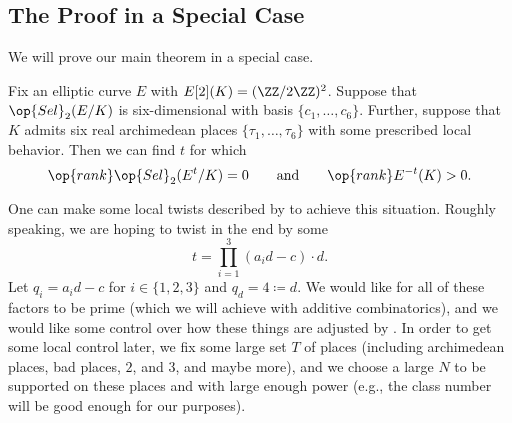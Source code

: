 \documentclass[../notes.tex]{subfiles}
\begin{document}
\subsection{The Proof in a Special Case}
We will prove our main theorem in a special case.
\begin{theorem}
	Fix an elliptic curve $E$ with $E[2](K)=(\ZZ/2\ZZ)^2$. Suppose that $\op{Sel}_2(E/K)$ is six-dimen\-sional with basis $\{c_1,\ldots,c_6\}$. Further, suppose that $K$ admits six real archimedean places $\{\tau_1,\ldots,\tau_6\}$ with some prescribed local behavior. %
	Then we can find $t$ for which
	\[\op{rank}\op{Sel}_2(E^t/K)=0\qquad\text{and}\qquad\op{rank}E^{-t}(K)>0.\]
\end{theorem}
One can make some local twists described by  to achieve this situation. Roughly speaking, we are hoping to twist in the end by some
\[t=\prod_{i=1}^3(a_id-c)\cdot d.\]
Let $q_i=a_id-c$ for $i\in\{1,2,3\}$ and $q_d=4\coloneqq d$. We would like for all of these factors to be prime (which we will achieve with additive combinatorics), and we would like some control over how these things are adjusted by . In order to get some local control later, we fix some large set $T$ of places (including archimedean places, bad places, $2$, and $3$, and maybe more), and we choose a large $N$ to be supported on these places and with large enough power (e.g., the class number will be good enough for our purposes).
\end{document}
